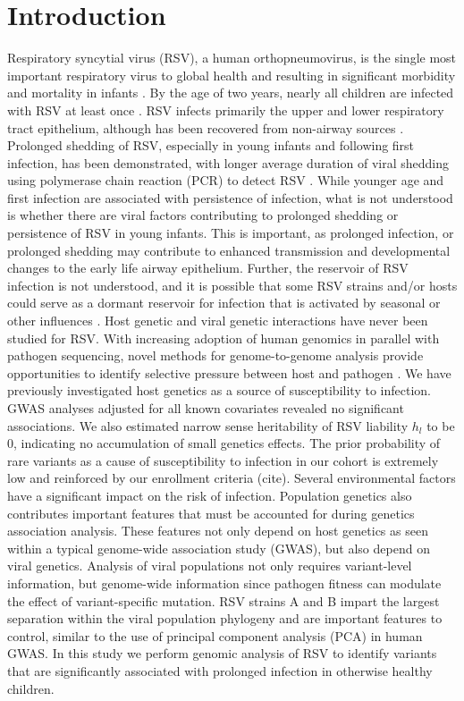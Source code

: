 \documentclass{article} %
\begin{document}
\section{Introduction}
Respiratory syncytial virus (RSV), a human orthopneumovirus, is the single most important respiratory virus to global health and resulting in significant morbidity and mortality in infants 
\cite{hall_burden_2009}.
By the age of two years, nearly all children are infected with RSV at least once 
\cite{glezen_risk_1986}.
RSV infects primarily the upper and lower respiratory tract epithelium, although has been recovered from non-airway sources 
\cite{bokun_respiratory_2019,
cubie_detection_1997,
nadal_isolation_1990,
odonnell_respiratory_1998,
rezaee_respiratory_2011,
rohwedder_detection_1998}.
Prolonged shedding of RSV, especially in young infants and following first infection, has been demonstrated, with longer average duration of viral shedding using polymerase chain reaction (PCR) to detect RSV 
\cite{munywoki_influence_2015}.
While younger age and first infection are associated with persistence of infection, what is not understood is whether there are viral factors contributing to prolonged shedding or persistence of RSV in young infants. 
This is important, as prolonged infection, or prolonged shedding may contribute to enhanced transmission and developmental changes to the early life airway epithelium. 
Further, the reservoir of RSV infection is not understood, 
and it is possible that some RSV strains and/or hosts could serve as a dormant reservoir for infection that is activated by seasonal or other influences 
\cite{hobson_prolonged_2008}.
Host genetic and viral genetic interactions have never been studied for RSV.
With increasing adoption of human genomics in parallel with pathogen sequencing, novel methods for genome-to-genome analysis provide opportunities to identify selective pressure between host and pathogen \cite{naret2018correcting}.
We have previously investigated host genetics as a source of susceptibility to infection.
GWAS analyses adjusted for 
all known covariates revealed no significant associations.
We also estimated narrow sense heritability of RSV liability $h_l$ to be 0, indicating no accumulation of small genetics effects. 
The prior probability of rare variants as a cause of susceptibility
to infection in our cohort is extremely low and reinforced by our enrollment criteria (cite).
Several environmental factors have a significant impact on the risk of infection. 
Population genetics also contributes important features that must be accounted for during genetics association analysis. 
These features not only depend on host genetics as seen within a typical genome-wide association study (GWAS), but also depend on viral genetics.
Analysis of viral populations not only requires variant-level information, but genome-wide information since pathogen fitness can modulate the effect of variant-specific mutation.  
RSV strains A and B impart the largest separation within the viral population phylogeny and are important features to control, similar to the use of principal component analysis (PCA) in human GWAS.
In this study we perform genomic analysis of RSV to identify variants that are significantly associated with prolonged infection in otherwise healthy children.
\end{document}
